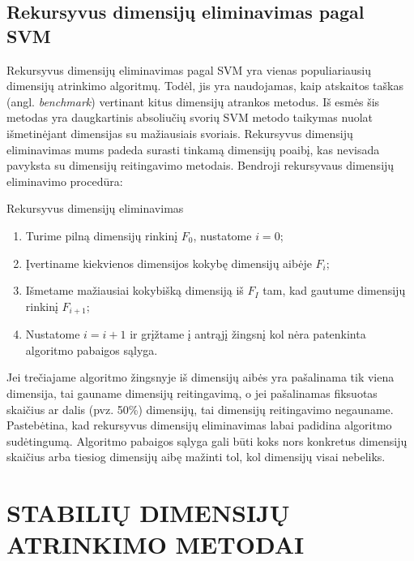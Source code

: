 \subsection{Rekursyvus dimensijų eliminavimas pagal SVM}

Rekursyvus dimensijų eliminavimas pagal SVM \cite{guyon2002gene} yra vienas populiariausių dimensijų
atrinkimo algoritmų. Todėl, jis yra naudojamas, kaip atskaitos taškas (angl. \textit{benchmark})
vertinant kitus dimensijų atrankos metodus. Iš esmės šis metodas yra daugkartinis 
absoliučių svorių SVM metodo taikymas nuolat išmetinėjant dimensijas su 
mažiausiais svoriais. Rekursyvus dimensijų eliminavimas mums padeda surasti 
tinkamą dimensijų poaibį, kas nevisada pavyksta su dimensijų reitingavimo 
metodais. Bendroji rekursyvaus dimensijų eliminavimo procedūra:
\begin{algorithm}
\caption{Rekursyvus dimensijų eliminavimas}
\label{RFE}
 \begin{enumerate}
 \item Turime pilną dimensijų rinkinį $F_0$, nustatome $i=0$;
 \item Įvertiname kiekvienos dimensijos kokybę dimensijų aibėje $F_i$;
 \item Išmetame mažiausiai kokybišką dimensiją iš $F_I$ tam, kad gautume
 dimensijų rinkinį $F_{i+1}$;
 \item Nustatome $i=i+1$ ir grįžtame į antrąjį žingsnį kol nėra patenkinta 
 algoritmo pabaigos sąlyga.
\end{enumerate}
\end{algorithm}
Jei trečiajame algoritmo žingsnyje iš dimensijų aibės yra pašalinama tik viena dimensija, tai gauname dimensijų reitingavimą, o jei pašalinamas fiksuotas skaičius ar dalis (pvz. 50\%) dimensijų, tai dimensijų reitingavimo negauname. Pastebėtina, kad rekursyvus dimensijų eliminavimas labai padidina algoritmo sudėtingumą. Algoritmo pabaigos sąlyga gali būti koks nors konkretus dimensijų skaičius arba tiesiog dimensijų aibę mažinti tol, kol dimensijų visai nebeliks.

\section{STABILIŲ DIMENSIJŲ ATRINKIMO METODAI}
\label{stabiliu_dimensiju_atrinkimo_metodai}

